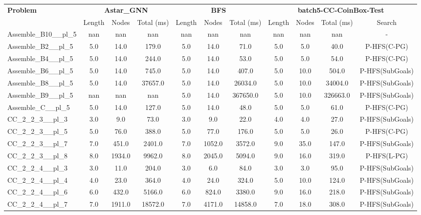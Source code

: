 \begin{table}[!ht]
\centering
\scriptsize
\begin{tabular}{l|ccc|ccc|cccc}
\multirow{2}{*}{\textbf{Problem}} & \multicolumn{3}{c|}{\textbf{Astar\_GNN}} & \multicolumn{3}{c|}{\textbf{BFS}} & \multicolumn{4}{c}{\textbf{batch5-CC-CoinBox-Test}} \\
\cline{2-11}
& Length & Nodes & Total (ms) & Length & Nodes & Total (ms) & Length & Nodes & Total (ms) & Search \\
\hline
Assemble\_B10\_\_pl\_5 & nan & nan & nan & nan & nan & nan & nan & nan & nan & - \\
Assemble\_B2\_\_pl\_5 & 5.0 & 14.0 & 179.0 & 5.0 & 14.0 & 71.0 & 5.0 & 5.0 & 40.0 & P-HFS(C-PG) \\
Assemble\_B4\_\_pl\_5 & 5.0 & 14.0 & 244.0 & 5.0 & 14.0 & 53.0 & 5.0 & 5.0 & 54.0 & P-HFS(C-PG) \\
Assemble\_B6\_\_pl\_5 & 5.0 & 14.0 & 745.0 & 5.0 & 14.0 & 407.0 & 5.0 & 10.0 & 504.0 & P-HFS(SubGoals) \\
Assemble\_B8\_\_pl\_5 & 5.0 & 14.0 & 37657.0 & 5.0 & 14.0 & 26034.0 & 5.0 & 10.0 & 34004.0 & P-HFS(SubGoals) \\
Assemble\_B9\_\_pl\_5 & nan & nan & nan & 5.0 & 14.0 & 367650.0 & 5.0 & 10.0 & 326663.0 & P-HFS(SubGoals) \\
Assemble\_C\_\_pl\_5 & 5.0 & 14.0 & 127.0 & 5.0 & 14.0 & 48.0 & 5.0 & 5.0 & 61.0 & P-HFS(C-PG) \\
CC\_2\_2\_3\_\_pl\_3 & 3.0 & 9.0 & 73.0 & 3.0 & 9.0 & 22.0 & 4.0 & 4.0 & 27.0 & P-HFS(SubGoals) \\
CC\_2\_2\_3\_\_pl\_5 & 5.0 & 76.0 & 388.0 & 5.0 & 77.0 & 176.0 & 5.0 & 5.0 & 26.0 & P-HFS(C-PG) \\
CC\_2\_2\_3\_\_pl\_7 & 7.0 & 451.0 & 2401.0 & 7.0 & 1052.0 & 3572.0 & 9.0 & 35.0 & 147.0 & P-HFS(SubGoals) \\
CC\_2\_2\_3\_\_pl\_8 & 8.0 & 1934.0 & 9962.0 & 8.0 & 2045.0 & 5094.0 & 9.0 & 16.0 & 319.0 & P-HFS(L-PG) \\
CC\_2\_2\_4\_\_pl\_3 & 3.0 & 11.0 & 204.0 & 3.0 & 6.0 & 84.0 & 3.0 & 3.0 & 95.0 & P-HFS(SubGoals) \\
CC\_2\_2\_4\_\_pl\_4 & 4.0 & 23.0 & 364.0 & 4.0 & 24.0 & 324.0 & 5.0 & 10.0 & 124.0 & P-HFS(SubGoals) \\
CC\_2\_2\_4\_\_pl\_6 & 6.0 & 432.0 & 5166.0 & 6.0 & 824.0 & 3380.0 & 9.0 & 16.0 & 218.0 & P-HFS(SubGoals) \\
CC\_2\_2\_4\_\_pl\_7 & 7.0 & 1911.0 & 18572.0 & 7.0 & 4171.0 & 14858.0 & 7.0 & 18.0 & 308.0 & P-HFS(SubGoals) \\

\end{tabular}
\end{table}
